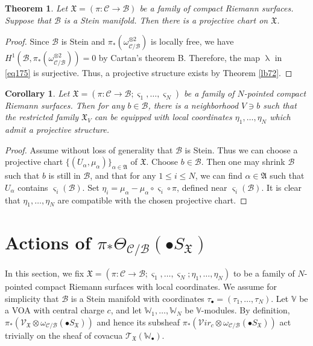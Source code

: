 \documentclass[12pt,b5paper,notitlepage]{report}
\theoremstyle{definition}
\theoremstyle{plain}
\newtheorem{thm}[df]{Theorem}
\newtheorem{co}[df]{Corollary}
\newcommand{\fk}{\mathfrak}
\newcommand{\mc}{\mathcal}
\newcommand{\scr}{\mathscr}
\newcommand{\sgm}{\varsigma}
\newcommand{\blt}{\bullet}
\newcommand{\Vbb}{\mathbb V}
\newcommand{\Wbb}{\mathbb W}
\newcommand{\svir}{\mathcal V\!\mathit{ir}}
\numberwithin{equation}{section}
\begin{document}
\begin{thm}\label{lb71}
Let $\fk X=(\pi:\mc C\rightarrow\mc B)$ be a family of compact Riemann surfaces. Suppose that $\mc B$ is a Stein manifold. Then there is a projective chart on $\fk X$.
\end{thm}




\begin{proof}
Since $\mc B$ is Stein and $\pi_*(\omega_{\mc C/\mc B}^{\otimes 2})$ is locally free, we have $H^1(\mc B,\pi_*(\omega_{\mc C/\mc B}^{\otimes 2}))=0$ by Cartan's theorem B. Therefore, the map $\uplambda$ in \eqref{eq175} is surjective. Thus, a projective structure exists by Theorem \ref{lb72}.
\end{proof}











\begin{co}
Let $\fk X=(\pi:\mc C\rightarrow\mc B;\sgm_1,\dots,\sgm_N)$ be a family of $N$-pointed compact Riemann surfaces. Then for any $b\in\mc B$, there is a neighborhood $V\ni b$ such that the restricted family $\fk X_V$ can be equipped with local coordinates $\eta_1,\dots,\eta_N$ which admit a projective structure.
\end{co}



\begin{proof}
Assume without loss of generality that $\mc B$ is Stein. Thus we can choose a projective chart $\{(U_\alpha,\mu_\alpha)\}_{\alpha\in\fk A}$ of $\fk X$. Choose $b\in \mc B$. Then one may shrink $\mc B$ such that $b$ is still in $\mc B$, and that for any $1\leq i\leq N$, we can find $\alpha\in\fk A$ such that $U_\alpha$ contains $\sgm_i(\mc B)$. Set $\eta_i=\mu_\alpha-\mu_\alpha\circ\sgm_i\circ\pi$, defined near $\sgm_i(\mc B)$. It is clear that $\eta_1,\dots,\eta_N$ are compatible with the chosen projective chart.
\end{proof}




\section{Actions of $\pi_*\Theta_{\mc C/\mc B}(\blt S_{\fk X})$}\label{lb139}


In this section, we fix  $\fk X=(\pi:\mc C\rightarrow\mc B;\sgm_1,\dots,\sgm_N;\eta_1,\dots,\eta_N)$ to be a family of $N$-pointed compact Riemann surfaces with local coordinates. We assume for simplicity that $\mc B$ is a Stein manifold with coordinates $\tau_\blt=(\tau_1,\dots,\tau_N)$. Let $\Vbb$ be a VOA with central charge $c$, and let $\Wbb_1,\dots,\Wbb_N$ be $\Vbb$-modules. By definition, $\pi_*(\scr V_{\fk X}\otimes\omega_{\mc C/\mc B}(\blt S_{\fk X}))$ and hence its subsheaf $\pi_*(\svir_c\otimes\omega_{\mc C/\mc B}(\blt S_{\fk X}))$ act trivially on the sheaf of covacua $\scr T_{\fk X}(\Wbb_\blt)$.
\end{document}
